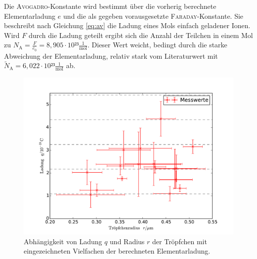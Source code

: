 Die \textsc{Avogadro}-Konstante wird bestimmt über die vorherig berechnete Elementarladung $e$ und die als gegeben vorausgesetzte \textsc{Faraday}-Konstante. Sie beschreibt nach Gleichung \eqref{eq:av} die Ladung eines Mols einfach geladener Ionen. Wird $F$ durch die Ladung geteilt ergibt sich die Anzahl der Teilchen in einem Mol zu $N_\mathup{A}=\frac{F}{e_0}=8,905\cdot10²³\frac{1}{\si\mol}$. Dieser Wert weicht, bedingt durch die starke Abweichung der Elementarladung, relativ stark vom Literaturwert \cite{texas_instruments3} mit $\tilde{N}_\mathup{A}=6,022\cdot10²³\frac{1}{\si\mol}$ ab.
\begin{figure}
	\centering
	\includegraphics[width=\textwidth]{Bilder/plot_messwerte+.pdf}
	\caption{Abhängigkeit von Ladung $q$ und Radius $r$ der Tröpfchen mit eingezeichneten Vielfachen der berechneten Elementarladung.}
	\label{fig:label1}
\end{figure}
